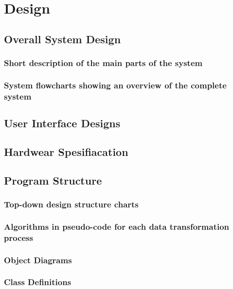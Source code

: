\chapter{Design}

\section{Overall System Design}

\subsection{Short description of the main parts of the system}

\subsection{System flowcharts showing an overview of the complete system}

\section{User Interface Designs}

\section{Hardwear Spesifiacation}

\section{Program Structure}

\subsection{Top-down design structure charts}

\subsection{Algorithms in pseudo-code for each data transformation process}

\subsection{Object Diagrams}

\subsection{Class Definitions}

